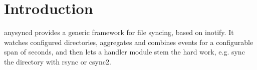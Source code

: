 \section{Introduction}
\label{sec:intro}

anysyncd provides a generic framework for file syncing, based on inotify. It
watches configured directories, aggregates and combines events for a
configurable span of seconds, and then lets a handler module stem the hard
work, e.g. sync the directory with rsync or csync2.

